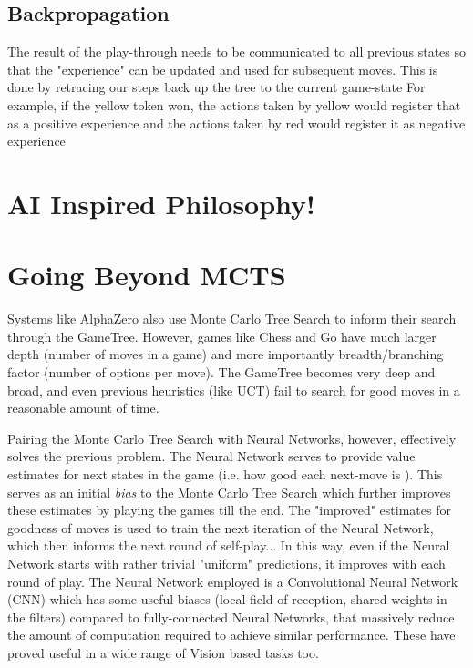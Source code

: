 \documentclass[12pt]{article}
\begin{document}
\subsection{Backpropagation}
The result of the play-through needs to be communicated to all previous states so that the "experience" can be updated and used for subsequent moves. This is done by retracing 
our steps back up the tree to the current game-state 
 For example, if the yellow token won,
the actions taken by yellow would register that as a positive experience and the actions taken by red would register it as negative experience



\section{AI Inspired Philosophy!}

\section{Going Beyond MCTS}
Systems like AlphaZero also use Monte Carlo Tree Search to inform their search through the GameTree. 
However, games like Chess and Go have much larger depth (number of moves in a game) and more importantly breadth/branching factor (number of options per move).
The GameTree becomes very deep and broad, and even previous heuristics (like UCT) fail to search for good moves in a reasonable amount of time. 

Pairing the Monte Carlo Tree Search with Neural Networks, however, effectively solves the previous problem. The Neural Network serves to
provide value estimates for next states in the game (i.e. how good each next-move is ). This serves as an initial \emph{bias} to the Monte
Carlo Tree Search which further improves these estimates by playing the games till the end. The "improved" estimates for goodness of moves
is used to train the next iteration of the Neural Network, which then informs the next round of self-play... In this way, even if the Neural
Network starts with rather trivial "uniform" predictions, it improves with each round of play. The Neural Network employed is a Convolutional
Neural Network (CNN) which has some useful biases (local field of reception, shared weights in the filters) compared to fully-connected Neural Networks, that massively reduce the amount of computation required
to achieve similar performance.
These have proved useful in a wide range of Vision based tasks too.
\end{document}
